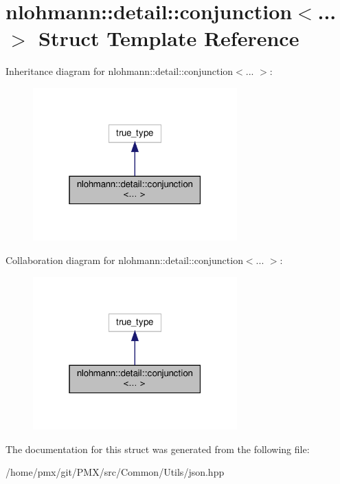 \hypertarget{structnlohmann_1_1detail_1_1conjunction}{}\section{nlohmann\+:\+:detail\+:\+:conjunction$<$... $>$ Struct Template Reference}
\label{structnlohmann_1_1detail_1_1conjunction}


Inheritance diagram for nlohmann\+:\+:detail\+:\+:conjunction$<$... $>$\+:
\nopagebreak
\begin{figure}[H]
\begin{center}
\leavevmode
\includegraphics[width=223pt]{structnlohmann_1_1detail_1_1conjunction__inherit__graph}
\end{center}
\end{figure}


Collaboration diagram for nlohmann\+:\+:detail\+:\+:conjunction$<$... $>$\+:
\nopagebreak
\begin{figure}[H]
\begin{center}
\leavevmode
\includegraphics[width=223pt]{structnlohmann_1_1detail_1_1conjunction__coll__graph}
\end{center}
\end{figure}


The documentation for this struct was generated from the following file\+:\begin{DoxyCompactItemize}
\item 
/home/pmx/git/\+P\+M\+X/src/\+Common/\+Utils/json.\+hpp\end{DoxyCompactItemize}
